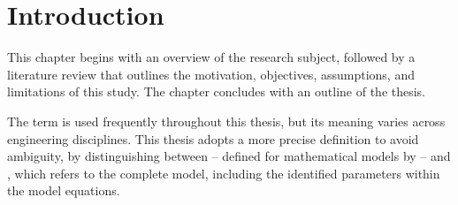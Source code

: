\chapter{Introduction}
\noindent This chapter begins with an overview of the research subject, followed by a literature review that outlines the motivation, objectives, assumptions, and limitations of this study. The chapter concludes with an outline of the thesis.

The term  is used frequently throughout this thesis, but its meaning varies across engineering disciplines. This thesis adopts a more precise definition to avoid ambiguity, by distinguishing between  -- defined for mathematical models by  -- and , which refers to the complete model, including the identified parameters within the model equations.








